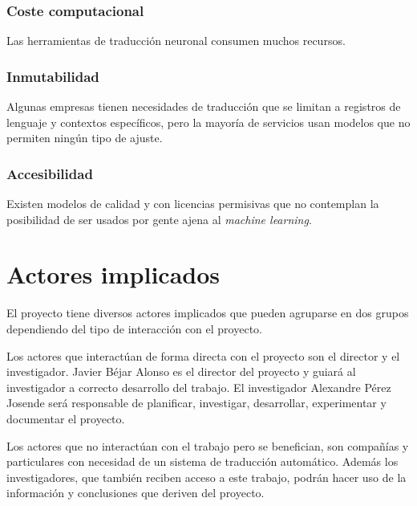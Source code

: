 \subsubsection{Coste computacional}
Las herramientas de traducción neuronal consumen muchos recursos.

\subsubsection{Inmutabilidad}
Algunas empresas tienen necesidades de traducción que se limitan a registros de
lenguaje y contextos específicos, pero la mayoría de servicios usan modelos que no
permiten ningún tipo de ajuste.

\subsubsection{Accesibilidad}
Existen modelos de calidad y con licencias permisivas que no contemplan la posibilidad de
ser usados por gente ajena al \textit{machine learning}.


\section{Actores implicados}
El proyecto tiene diversos actores implicados que pueden agruparse en dos grupos dependiendo
del tipo de interacción con el proyecto.

Los actores que interactúan de forma directa con el proyecto son el director y el investigador.
Javier Béjar Alonso es el director del proyecto y guiará al investigador a correcto desarrollo
del trabajo. El investigador Alexandre Pérez Josende será responsable de planificar, investigar,
desarrollar, experimentar y documentar el proyecto.

Los actores que no interactúan con el trabajo pero se benefician, son compañías y particulares
con necesidad de un sistema de traducción automático. Además los investigadores, que también reciben
acceso a este trabajo, podrán hacer uso de la información y conclusiones que deriven del proyecto.